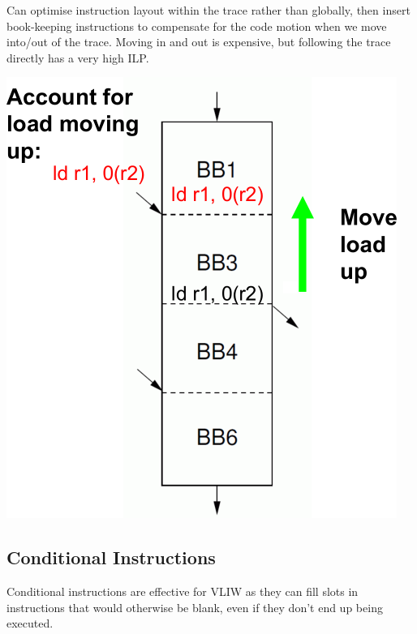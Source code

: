 \documentclass[11pt]{article}
\begin{document}
{{{\begin{minipage}[t]{0.55\textwidth}
            Can optimise instruction layout within the trace rather than globally, then insert book-keeping instructions to compensate for the code motion when we move into/out of the trace. Moving in and out is expensive, but following the trace directly has a very high ILP.
            \end{minipage}
            \hspace{5mm}
            \begin{minipage}[t]{0.4\textwidth}
            \vspace{0pt}
            \centering
            \includegraphics[width=\textwidth]{trace-scheduling.png}
            \end{minipage}
        }
    }
    \subsection*{Conditional Instructions}
    {
        Conditional instructions are effective for VLIW as they can fill slots in instructions that would otherwise be blank, even if they don't end up being executed.
    }
}
\end{document}
